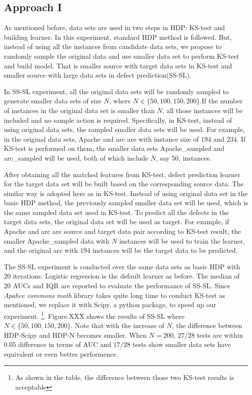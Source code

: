 \subsection{Approach I}

As mentioned before, data sets are used in two steps in HDP: KS-test and building learner. In this experiment, standard HDP method is followed. But, instead of using all the instances from candidate data sets, we propose to randomly sample the original data and use smaller data set to perform KS-test and build model. That is smaller source with target data sets in KS-test and smaller source with large data sets in defect prediction(SS-SL).

In SS-SL experiment, all the original data sets will be randomly sampled to generate smaller data sets of size $N$, where $N \in \{50, 100, 150, 200\}$.If the number of instances in the original data set is smaller than $N$, all those instances will be included and no sample action is required. Specifically, in KS-test, instead of using original data sets, the sampled smaller data sets will be used. For example, in the original data sets, Apache and arc are with instance size of $194$ and $234$. If KS-test is performed on them, the smaller data sets Apache\_sampled and arc\_sampled will be used, both of which include $N$, say 50, instances. 

After obtaining all the matched features from KS-test, defect prediction learner for the target data set will be built based on the corresponding source data. The similar way is adopted here as in KS-test. Instead of using original data set in the basic HDP method, the previously sampled smaller data set will be used, which is the same sampled data set used in KS-test. To predict all the defects in the target data sets, the original data set will be used as target. For example, if Apache and arc are source and target data pair according to KS-test result, the smaller Apache\_sampled data with $N$ instances will be used to train the learner, and the original arc with $194$ instances will be the target data to be predicted.

The SS-SL experiment is conducted over the same data sets as basic HDP with 20 iterations. Logistic regression is the default learner as before. The median of 20 AUCs and IQR are reported to evaluate the performance of SS-SL. Since {\it Apahce commons math} library takes quite long time to conduct KS-test as mentioned, we replace it with Scipy, a python package, to speed up our experiment. \footnote{As shown in the table, the difference between those two KS-test results is acceptable}. Figure.XXX shows the results of SS-SL where $N \in \{50,100,150,200\}$. Note that with the increase of $N$, the difference between HDP-Scipy and HDP-N becomes smaller. When $N=200$, $27/28$ tests are within 0.05 difference in terms of AUC and $17/28$ tests show smaller data sets have equivalent or even better performence.

